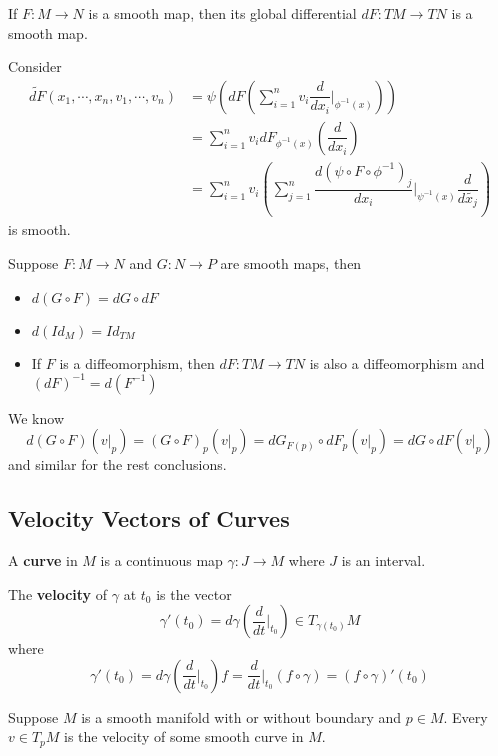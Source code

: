 \begin{proposition}
    If $F:M\to N$ is a smooth map, then its global differential $dF:TM\to TN$ is a smooth map.
\end{proposition}
\Pf\par
Consider
\[
\begin{aligned}
    \widetilde{dF}(x_1,\cdots,x_n,v_1,\cdots,v_n) &= \psi\left(dF(\sum\limits_{i=1}^n v_i\dfrac{d}{dx_i}\Big|_{\phi^{-1}(x)})\right) \\
    &= \sum\limits_{i=1}^nv_i dF_{\phi^{-1}(x)}\left(\dfrac{d}{dx_i}\right) \\
    &= \sum\limits_{i=1}^n v_i\left(\sum\limits_{j=1}^n\dfrac{d\left(\psi\circ F\circ\phi^{-1}\right)_j}{dx_i}\Big|_{\psi^{-1}(x)}\dfrac{d}{d\widetilde{x_j}}\right)
\end{aligned}
\]
is smooth.

\begin{corollary}
    Suppose $F:M\to N$ and $G:N\to P$ are smooth maps, then
    \begin{itemize}
        \item $d(G\circ F) = dG\circ dF$
        \item $d(Id_M) = Id_{TM}$
        \item If $F$ is a diffeomorphism, then $dF:TM\to TN$ is also a diffeomorphism and $(dF)^{-1} = d(F^{-1})$
    \end{itemize}
\end{corollary}
\Pf\par
    We know
    \[d(G\circ F)(v|_p) = (G\circ F)_p(v|_p) = dG_{F(p)}\circ dF_p(v|_p) = dG\circ dF(v|_p)\]
    and similar for the rest conclusions.

\subsection{Velocity Vectors of Curves}

\begin{definition}
    A \textbf{curve} in $M$ is a continuous map $\gamma: J \to M$ where $J$ is an interval.\par
    The \textbf{velocity} of $\gamma$ at $t_0$ is the vector
    \[\gamma'(t_0) = d\gamma(\dfrac{d}{dt}\Big|_{t_0}) \in T_{\gamma(t_0)}M\]
    where
    \[
    \gamma'(t_0) = d\gamma\left(\dfrac{d}{dt}\Big|_{t_0}\right)f = \dfrac{d}{dt}\Big|_{t_0}(f\circ \gamma) = (f\circ \gamma)'(t_0)
    \]
\end{definition}

\begin{proposition}
    Suppose $M$ is a smooth manifold with or without boundary and $p\in M$. Every $v\in T_pM$ is the velocity of some smooth curve in $M$.
\end{proposition}


